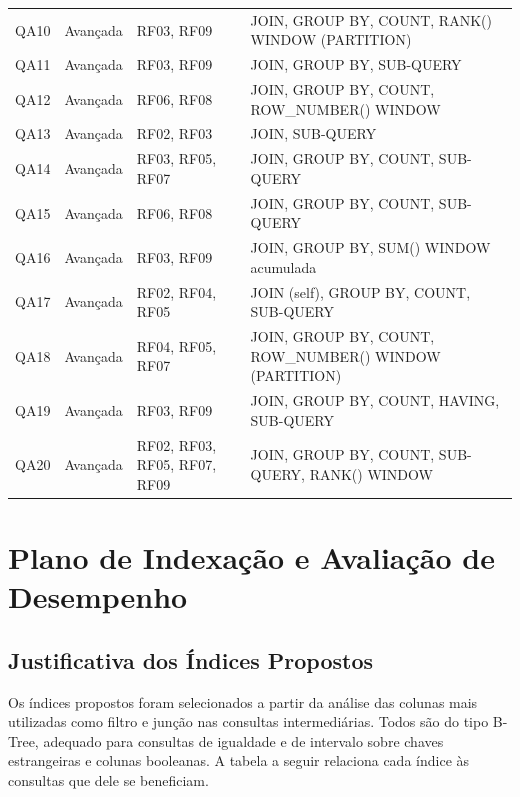 \documentclass[12pt,a4paper]{article}
\begin{document}
\begin{longtable}{|c|l|l|p{6.5cm}|}
QA10 & Avançada & RF03, RF09 & JOIN, GROUP BY, COUNT, RANK() WINDOW (PARTITION) \\
QA11 & Avançada & RF03, RF09 & JOIN, GROUP BY, SUB-QUERY \\
QA12 & Avançada & RF06, RF08 & JOIN, GROUP BY, COUNT, ROW\_NUMBER() WINDOW \\
QA13 & Avançada & RF02, RF03 & JOIN, SUB-QUERY \\
QA14 & Avançada & RF03, RF05, RF07 & JOIN, GROUP BY, COUNT, SUB-QUERY \\
QA15 & Avançada & RF06, RF08 & JOIN, GROUP BY, COUNT, SUB-QUERY \\
QA16 & Avançada & RF03, RF09 & JOIN, GROUP BY, SUM() WINDOW acumulada \\
QA17 & Avançada & RF02, RF04, RF05 & JOIN (self), GROUP BY, COUNT, SUB-QUERY \\
QA18 & Avançada & RF04, RF05, RF07 & JOIN, GROUP BY, COUNT, ROW\_NUMBER() WINDOW (PARTITION) \\
QA19 & Avançada & RF03, RF09 & JOIN, GROUP BY, COUNT, HAVING, SUB-QUERY \\
QA20 & Avançada & RF02, RF03, RF05, RF07, RF09 & JOIN, GROUP BY, COUNT, SUB-QUERY, RANK() WINDOW \\
\hline
\end{longtable}
\normalsize

\section{Plano de Indexação e Avaliação de Desempenho}
\label{sec:indexacao}

\subsection{Justificativa dos Índices Propostos}
\label{subsec:indices-justif}
Os índices propostos foram selecionados a partir da análise das colunas mais utilizadas como filtro e junção nas consultas intermediárias. Todos são do tipo B-Tree, adequado para consultas de igualdade e de intervalo sobre chaves estrangeiras e colunas booleanas. A tabela a seguir relaciona cada índice às consultas que dele se beneficiam.
\end{document}
